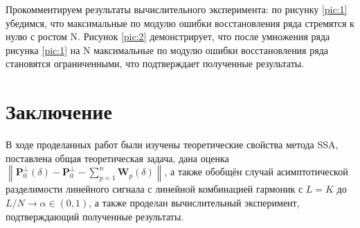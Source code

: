 \documentclass[specialist,
               substylefile = spbu_report.rtx,
               subf,href,colorlinks=true, 12pt]{disser}
\newcommand\norm[1]{\left\|#1\right\|}
\begin{document}
\clearpage
Прокомментируем результаты вычислительного эксперимента: по рисунку \ref{pic:1} убедимся, что максимальные по модулю ошибки восстановления ряда стремятся к нулю с ростом N. Рисунок \ref{pic:2} демонстрирует, что после умножения ряда рисунка \ref{pic:1} на N максимальные по модулю ошибки восстановления ряда становятся ограниченными, что подтверждает полученные результаты.
\section{Заключение}
В ходе проделанных работ были изучены теоретические свойства метода SSA, поставлена общая теоретическая задача, дана оценка $\norm{\mathbf{P}_0^\bot(\delta) - \mathbf{P}_0^\bot - \sum\limits^n_{p=1}\mathbf{W}_p(\delta)}$, а также обобщён случай асимптотической разделимости линейного сигнала с линейной комбинацией гармоник с $L=K$ до $L/N\rightarrow\alpha\in(0,1)$, а также проделан вычислительный эксперимент, подтверждающий полученные результаты. 



\end{document}
